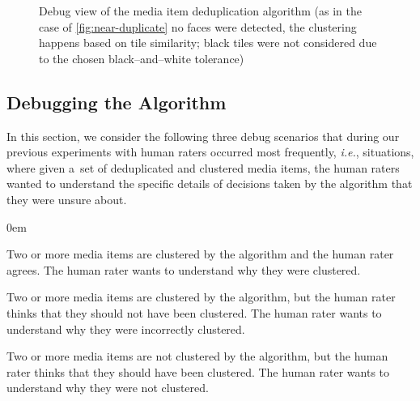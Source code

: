 \documentclass{article}
\begin{document}
\begin{figure}[t!]
  \centering
  \caption{Debug view of the media item deduplication algorithm
    (as in the case of \autoref{fig:near-duplicate} no faces were detected,
    the clustering happens based on tile similarity;
    black tiles were not considered due to the chosen black--and--white tolerance)}
  \label{fig:algorithmdebug}  
\end{figure}

\subsection{Debugging the Algorithm}
\label{sec:debugging-the-algorithm}

In this section, we consider the following three debug scenarios
that during our previous experiments with human raters
occurred most frequently, \emph{i.e.}, situations,
where given a~set of deduplicated and clustered media items,
the human raters wanted to understand the specific details
of decisions taken by the algorithm that they were unsure about.

\begin{description}
  \itemsep0em 
  \item[Clustering Consent]
    Two or more media items are clustered by the algorithm
    and the human rater agrees.
    The human rater wants to understand why they were clustered.
  \item[Clustering Dissent]
    Two or more media items are clustered by the algorithm,
    but the human rater thinks that they should not have been clustered.
    The human rater wants to understand why they were incorrectly clustered.
  \item[Non-Clustering Dissent]
    Two or more media items are not clustered by the algorithm,
    but the human rater thinks that they should have been clustered.
    The human rater wants to understand why they were not clustered.
\end{description}
\end{document}
